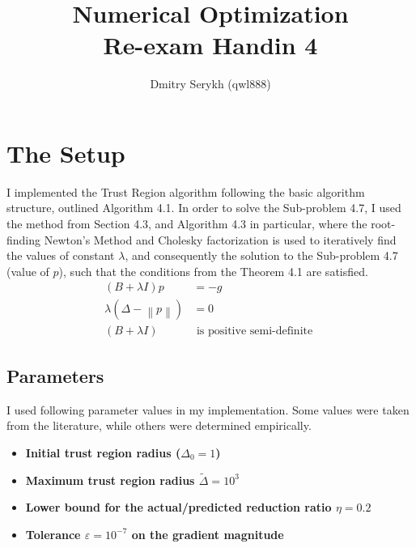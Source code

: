 \documentclass[a4paper]{article}
\title{\vspace{-5cm} Numerical Optimization \\ Re-exam Handin 4}
\author{Dmitry Serykh (qwl888)}
\begin{document}
\maketitle
\section{The Setup}
I implemented the Trust Region algorithm following the basic algorithm
structure, outlined Algorithm 4.1. In order to solve the Sub-problem 4.7, I used
the method from Section 4.3, and Algorithm 4.3 in particular, where the root-finding Newton's
Method and Cholesky factorization is used to iteratively find the values of
constant $\lambda$, and consequently the solution to the Sub-problem 4.7 (value
of $p$), such that the conditions from the Theorem 4.1 are satisfied.
\[
\begin{aligned}(B+\lambda I) p &=-g \\ \lambda\left(\Delta-\left\|p\right\|\right) &=0 \\(B+\lambda I) & \text { is positive semi-definite } \end{aligned}
\]

\subsection{Parameters}
I used following parameter values in my implementation. Some values were taken
from the literature, while others were determined empirically.
\begin{itemize}
\item \textbf{Initial trust region radius ($\Delta_0 = 1$)}
\item \textbf{Maximum trust region radius $\tilde{\Delta}=10^3$}
\item \textbf{Lower bound for the actual/predicted reduction ratio $\eta=0.2$}
\item \textbf{Tolerance $\varepsilon = 10^{-7}$ on the gradient magnitude}
\end{itemize}
\end{document}
